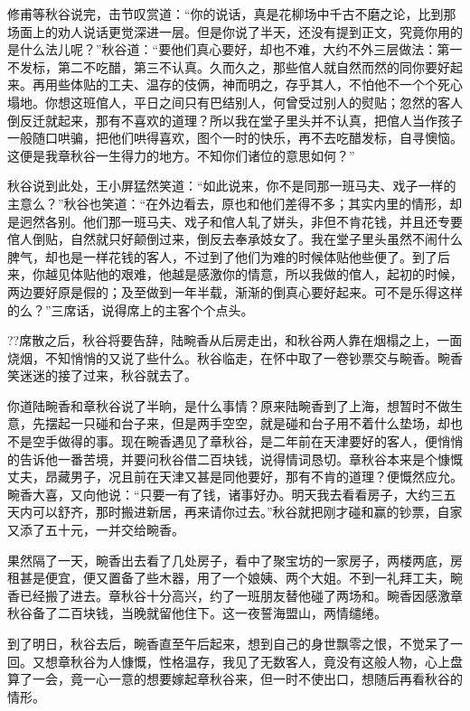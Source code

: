 \documentclass[12pt,UTF8]{ctexbook}
\begin{document}
{{{修甫等秋谷说完，击节叹赏道：“你的说话，真是花柳场中千古不磨之论，比到那场面上的劝人说话更觉深进一层。但是你说了半天，还没有提到正文，究竟你用的是什么法儿呢？”秋谷道：“要他们真心要好，却也不难，大约不外三层做法：第一不发标，第二不吃醋，第三不认真。久而久之，那些倌人就自然而然的同你要好起来。再用些体贴的工夫、温存的伎俩，神而明之，存乎其人，不怕他不一个个死心塌地。你想这班倌人，平日之间只有巴结别人，何曾受过别人的熨贴；忽然的客人倒反迁就起来，那有不喜欢的道理？所以我在堂子里头并不认真，把倌人当作孩子一般随口哄骗，把他们哄得喜欢，图个一时的快乐，再不去吃醋发标，自寻懊恼。这便是我章秋谷一生得力的地方。不知你们诸位的意思如何？”

秋谷说到此处，王小屏猛然笑道：“如此说来，你不是同那一班马夫、戏子一样的主意么？”秋谷也笑道：“在外边看去，原也和他们差得不多；其实内里的情形，却是迥然各别。他们那一班马夫、戏子和倌人轧了姘头，非但不肯花钱，并且还专要倌人倒贴，自然就只好颠倒过来，倒反去奉承妓女了。我在堂子里头虽然不闹什么脾气，却也是一样花钱的客人，不过到了他们为难的时候体贴他些便了。到了后来，你越见体贴他的艰难，他越是感激你的情意，所以我做的倌人，起初的时候，两边要好原是假的；及至做到一年半载，渐渐的倒真心要好起来。可不是乐得这样的么？”三席话，说得席上的主客个个点头。

??席散之后，秋谷将要告辞，陆畹香从后房走出，和秋谷两人靠在烟榻之上，一面烧烟，不知悄悄的又说了些什么。秋谷临走，在怀中取了一卷钞票交与畹香。畹香笑迷迷的接了过来，秋谷就去了。

你道陆畹香和章秋谷说了半晌，是什么事情？原来陆畹香到了上海，想暂时不做生意，先摆起一只碰和台子来，但是两手空空，就是碰和台子用不着什么垫场，却也不是空手做得的事。现在畹香遇见了章秋谷，是二年前在天津要好的客人，便悄悄的告诉他一番苦境，并要问秋谷借二百块钱，说得情词恳切。章秋谷本来是个慷慨丈夫，昂藏男子，况且前在天津又甚是同他要好，那有不肯的道理？便慨然应允。畹香大喜，又向他说：“只要一有了钱，诸事好办。明天我去看看房子，大约三五天内可以舒齐，那时搬进新居，再来请你过去。”秋谷就把刚才碰和赢的钞票，自家又添了五十元，一并交给畹香。

果然隔了一天，畹香出去看了几处房子，看中了聚宝坊的一家房子，两楼两底，房租甚是便宜，便又置备了些木器，用了一个娘姨、两个大姐。不到一礼拜工夫，畹香已经搬了进去。章秋谷十分高兴，约了一班朋友替他碰了两场和。畹香因感激章秋谷备了二百块钱，当晚就留他住下。这一夜誓海盟山，两情缱绻。

到了明日，秋谷去后，畹香直至午后起来，想到自己的身世飘零之恨，不觉呆了一回。又想章秋谷为人慷慨，性格温存，我见了无数客人，竟没有这般人物，心上盘算了一会，竟一心一意的想要嫁起章秋谷来，但一时不使出口，想随后再看秋谷的情形。

}}}
\end{document}
